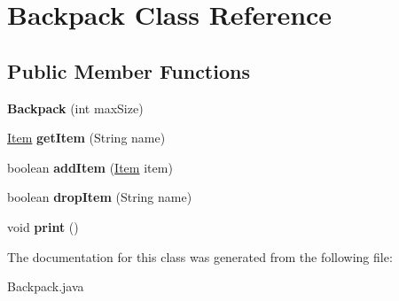 \hypertarget{class_backpack}{}\section{Backpack Class Reference}
\label{class_backpack}
\subsection*{Public Member Functions}
\begin{DoxyCompactItemize}
\item 
\hypertarget{class_backpack_a0133aab8842753b7e15e44ae1405b98e}{}{\bfseries Backpack} (int max\+Size)\label{class_backpack_a0133aab8842753b7e15e44ae1405b98e}

\item 
\hypertarget{class_backpack_ab6659457290a3589e69d50cdd12f0d1b}{}\hyperlink{class_item}{Item} {\bfseries get\+Item} (String name)\label{class_backpack_ab6659457290a3589e69d50cdd12f0d1b}

\item 
\hypertarget{class_backpack_af9628f7226b55d9c97659f230af73d41}{}boolean {\bfseries add\+Item} (\hyperlink{class_item}{Item} item)\label{class_backpack_af9628f7226b55d9c97659f230af73d41}

\item 
\hypertarget{class_backpack_a8860f8d3603fa6cefe41f93fcd23a4f6}{}boolean {\bfseries drop\+Item} (String name)\label{class_backpack_a8860f8d3603fa6cefe41f93fcd23a4f6}

\item 
\hypertarget{class_backpack_a7b9fc10f9aa368b40828d169fc7aaf08}{}void {\bfseries print} ()\label{class_backpack_a7b9fc10f9aa368b40828d169fc7aaf08}

\end{DoxyCompactItemize}


The documentation for this class was generated from the following file\+:\begin{DoxyCompactItemize}
\item 
Backpack.\+java\end{DoxyCompactItemize}
